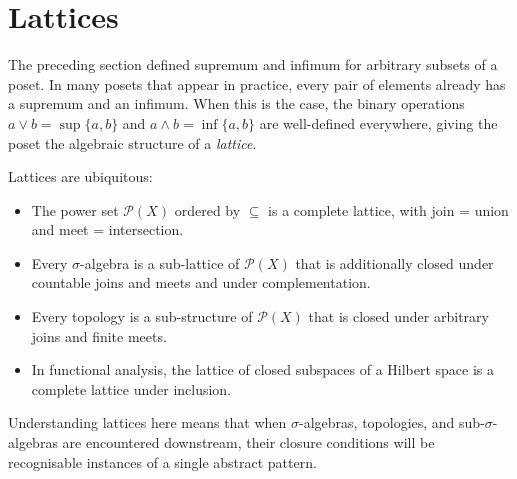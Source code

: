 
\section{Lattices}\label{sec:lattices}



\begin{exposition}
The preceding section defined supremum and infimum for arbitrary subsets of a
poset.  In many posets that appear in practice, every pair of elements already
has a supremum and an infimum.  When this is the case, the binary operations
$a \vee b = \sup\{a,b\}$ and $a \wedge b = \inf\{a,b\}$ are well-defined
everywhere, giving the poset the algebraic structure of a \emph{lattice}.
\end{exposition}

\begin{exposition}
Lattices are ubiquitous:
\end{exposition}
\begin{itemize}
  \item The power set $\mathcal{P}(X)$ ordered by $\subseteq$ is a complete
        lattice, with join = union and meet = intersection.
  \item Every $\sigma$-algebra is a sub-lattice of $\mathcal{P}(X)$
        that is additionally closed under countable joins and meets and under
        complementation.
  \item Every topology is a sub-structure of $\mathcal{P}(X)$ that is closed
        under arbitrary joins and finite meets.
  \item In functional analysis, the lattice of closed subspaces of a Hilbert
        space is a complete lattice under inclusion.
\end{itemize}
\begin{exposition}
Understanding lattices here means that when $\sigma$-algebras, topologies, and
sub-$\sigma$-algebras are encountered downstream, their closure conditions
will be recognisable instances of a single abstract pattern.
\end{exposition}

